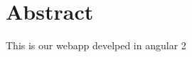 \chapter{Abstract}
\label{chap:abstract}

This is our webapp develped in angular 2\cite{Angular2:online}